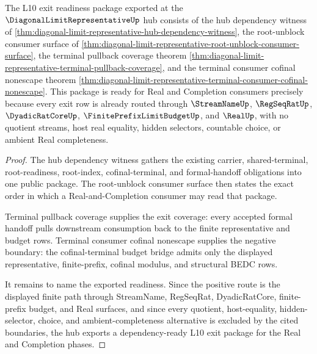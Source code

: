 \begin{theorem}
\label{thm:diagonal-limit-representative-l10-exit-readiness-package}
The L10 exit readiness package exported at the $\DiagonalLimitRepresentativeUp$ hub consists of the hub dependency witness of \autoref{thm:diagonal-limit-representative-hub-dependency-witness}, the root-unblock consumer surface of \autoref{thm:diagonal-limit-representative-root-unblock-consumer-surface}, the terminal pullback coverage theorem \autoref{thm:diagonal-limit-representative-terminal-pullback-coverage}, and the terminal consumer cofinal nonescape theorem \autoref{thm:diagonal-limit-representative-terminal-consumer-cofinal-nonescape}. This package is ready for Real and Completion consumers precisely because every exit row is already routed through $\StreamNameUp$, $\RegSeqRatUp$, $\DyadicRatCoreUp$, $\FinitePrefixLimitBudgetUp$, and $\RealUp$, with no quotient streams, host real equality, hidden selectors, countable choice, or ambient Real completeness.
\end{theorem}
\begin{proof}
The hub dependency witness gathers the existing carrier, shared-terminal, root-readiness, root-index, cofinal-terminal, and formal-handoff obligations into one public package. The root-unblock consumer surface then states the exact order in which a Real-and-Completion consumer may read that package.

Terminal pullback coverage supplies the exit coverage: every accepted formal handoff pulls downstream consumption back to the finite representative and budget rows. Terminal consumer cofinal nonescape supplies the negative boundary: the cofinal-terminal budget bridge admits only the displayed representative, finite-prefix, cofinal modulus, and structural BEDC rows.

It remains to name the exported readiness. Since the positive route is the displayed finite path through StreamName, RegSeqRat, DyadicRatCore, finite-prefix budget, and Real surfaces, and since every quotient, host-equality, hidden-selector, choice, and ambient-completeness alternative is excluded by the cited boundaries, the hub exports a dependency-ready L10 exit package for the Real and Completion phases.
\end{proof}
